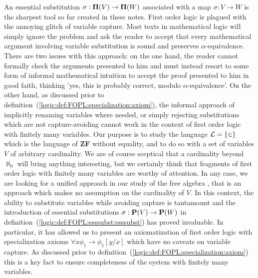 An essential substitution $\sigma:\mbox{${\bf\Pi}(V)$}\to{\bf\Pi}(W)$ associated
with a map $\sigma:V\to W$ is the sharpest tool so far created in
these notes. First order logic is plagued with the annoying glitch
of variable capture. Most texts in mathematical logic will simply
ignore the problem and ask the reader to accept that every
mathematical argument involving variable substitution is sound and
preserves $\alpha$-equivalence. There are two issues with this
approach: on the one hand, the reader cannot formally check the
arguments presented to him and must instead resort to some form of
informal mathematical intuition to accept the proof presented to him
in good faith, thinking 'yes, this is probably correct, modulo
$\alpha$-equivalence'. On the other hand, as discussed prior to
definition~(\ref{logic:def:FOPL:specialization:axiom}), the informal
approach of implicitly renaming variables where needed, or simply
rejecting substitutions which are not capture-avoiding cannot work
in the context of first order logic with finitely many variables.
Our purpose is to study the language ${\cal L}=\{\in\}$ which is the
language of {\bf ZF} without equality, and to do so with a set of
variables $V$ of arbitrary cardinality. We are of course sceptical
that a cardinality beyond $\aleph_{0}$ will bring anything
interesting, but we certainly think that fragments of first order
logic with finitely many variables are worthy of attention. In any
case, we are looking for a unified approach in our study of the free
algebra \pv, that is an approach which makes no assumption on the
cardinality of $V$. In this context, the ability to substitute
variables while avoiding capture is tantamount and the introduction
of essential substitutions $\sigma:\mbox{${\bf P}(V)$}\to{\bf P}(W)$ in
definition~(\ref{logic:def:FOPL:esssubst:esssubst}) has proved
invaluable. In particular, it has allowed us to present an
axiomatization of first order logic with specialization axioms
$\forall x\phi_{1}\to\phi_{1}[y/x]$ which have no caveats on
variable capture. As discussed prior to
definition~(\ref{logic:def:FOPL:specialization:axiom}) this is a key
fact to ensure completeness of the system with finitely many
variables.

